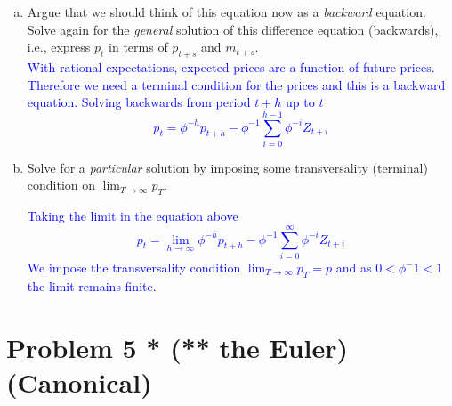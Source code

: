 \documentclass[11pt]{extarticle}
\theoremstyle{plain}
\theoremstyle{definition}
\begin{document}
\begin{enumerate}[(a)]
\item Argue that we should think of this equation now as a \textit{backward} equation. Solve again for the \textit{general} solution of this difference equation (backwards), i.e., express $p_t$ in terms of $p_{t+s}$ and $m_{t+s}$.\\
\textcolor{blue}{With rational expectations, expected prices are a function of future prices. Therefore we need a terminal condition for the prices and this is a backward equation. Solving backwards from period $t+h$ up to $t$ $$
p_t = \phi^{-h} p_{t+h}-\phi^{-1} \sum_{i=0}^{h-1} \phi^{-i} Z_{t+i}
$$} 

\item Solve for a \textit{particular} solution by imposing some transversality (terminal) condition on $\lim_{T \to \infty} p_T$. 

\textcolor{blue}{Taking the limit in the equation above $$p_t=\lim_{h \to \infty}\phi^{-h}p_{t+h}-\phi^{-1} \sum_{i=0}^{\infty} \phi^{-i} Z_{t+i}$$
We impose the transversality condition $\lim_{T \to \infty} p_T=p$ and as $0<\phi^-1<1$ the limit remains finite.}

\end{enumerate}


\vspace{10mm}
\section*{Problem 5 * (** the Euler) (Canonical)}
\end{document}
